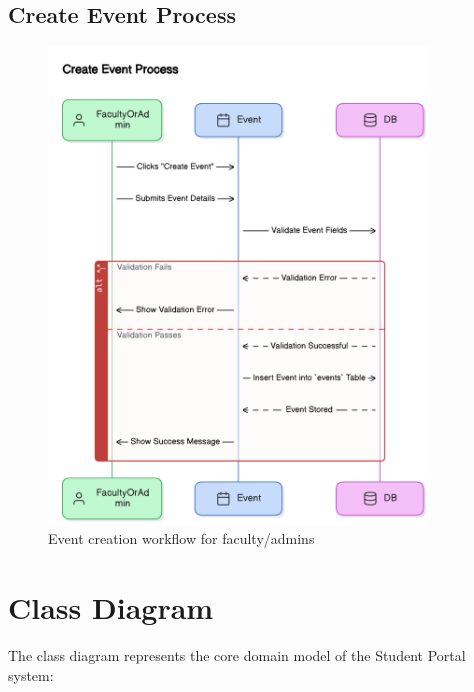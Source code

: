 \subsection{Create Event Process}
\begin{figure}[H]
    \centering
    \includegraphics[width=0.9\textwidth]{latex-doc/images/sequence_diagrams/create_event_process.png}
    \caption{Event creation workflow for faculty/admins}
    \label{fig:create_event}
\end{figure}

\vspace{3cm}

\section{Class Diagram}
The class diagram represents the core domain model of the Student Portal system:

